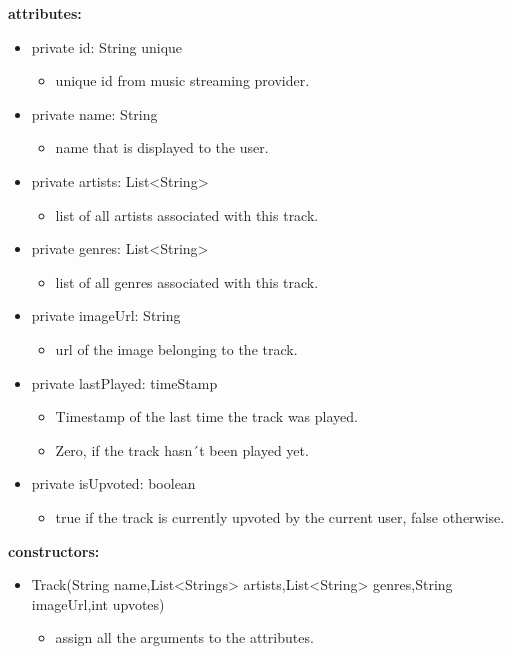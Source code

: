 \documentclass[oneside, ngerman]{sdqtechreport}
\begin{document}
\textbf{attributes:}
\begin{itemize}
    \item private id: String {unique}
    \begin{itemize}
        \item unique id from music streaming provider.
    \end{itemize}
    \item private name: String
    \begin{itemize}
        \item name that is displayed to the user.
    \end{itemize}
    \item private artists: List<String>
    \begin{itemize}
        \item list of all artists associated with this track.
    \end{itemize}
    \item private genres: List<String>
    \begin{itemize}
         \item list of all genres associated with this track.
    \end{itemize}
    \item private imageUrl: String
    \begin{itemize}
        \item url of the image belonging to the track.
    \end{itemize}
    \item private lastPlayed: timeStamp
    \begin{itemize}
        \item Timestamp of the last time the track was played.
        \item Zero, if the track hasn´t been played yet.
    \end{itemize}
    \item private isUpvoted: boolean
    \begin{itemize}
        \item true if the track is currently upvoted by the current user, false otherwise.
    \end{itemize}
\end{itemize}
\textbf{constructors:}
\begin{itemize}
    \item Track(String name,List<Strings> artists,List<String> genres,String imageUrl,int upvotes)
    \begin{itemize}
        \item assign all the arguments to the attributes.
    \end{itemize}
\end{itemize}
\end{document}
